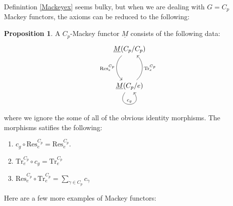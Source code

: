 \documentclass{article}
\theoremstyle{definition}
\newtheorem{proposition}[theorem]{Proposition}
\begin{document}
Definintion \ref{Mackeyex} seems bulky, but when we are dealing with $G=C_p$ Mackey functors, the axioms can be reduced to the following: 

\begin{tcolorbox}[colback=blue!5!white,colframe=blue!30!white]
\begin{proposition}
A $C_p$-Mackey functor $\underline{M}$ consists of the following data: 
\[\begin{tikzcd}
	{\underline{M}(C_p/C_p)} \\
	\\
	{\underline{M}(C_p/e)}
	\arrow["{\textrm{Res}^{C_p}_{e}}",swap, bend right=50, from=1-1, to=3-1]
	\arrow["{\textrm{Tr}^{C_p}_{e}}",swap, bend right=50, from=3-1, to=1-1]
	\arrow["{c_g}", from=3-1, to=3-1, loop, in=305, out=235, distance=10mm]
\end{tikzcd}\]
where we ignore the some of all of the obvious identity morphisms. The morphisms satifies the following:
\begin{enumerate}
    \item $c_g\circ \textrm{Res}^{C_p}_{e}=\textrm{Res}^{C_p}_{e}$.
    \item ${\textrm{Tr}^{C_p}_{e}}\circ c_g={\textrm{Tr}^{C_p}_{e}}$
    \item $\textrm{Res}^{C_p}_{e}\circ \textrm{Tr}^{C_p}_{e}=\sum_{\gamma\in C_p}c_{\gamma}$
\end{enumerate}

\end{proposition}
\end{tcolorbox}
Here are a few more examples of Mackey functors:
\end{document}
